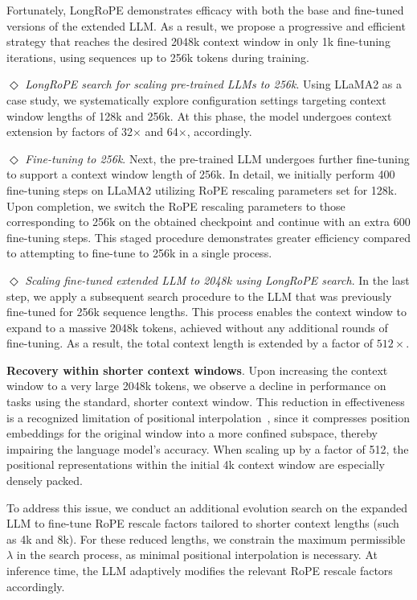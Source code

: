 Fortunately, LongRoPE demonstrates efficacy with both the base and fine-tuned versions of the extended LLM. As a result, we propose a progressive and efficient strategy that reaches the desired 2048k context window in only 1k fine-tuning iterations, using sequences up to 256k tokens during training.

$\Diamond$ \textit{LongRoPE search for scaling pre-trained LLMs to 256k}. Using LLaMA2 as a case study, we systematically explore configuration settings targeting context window lengths of 128k and 256k. At this phase, the model undergoes context extension by factors of 32$\times$ and 64$\times$, accordingly.

$\Diamond$ \textit{Fine-tuning to 256k}. Next, the pre-trained LLM undergoes further fine-tuning to support a context window length of 256k. In detail, we initially perform 400 fine-tuning steps on LLaMA2 utilizing RoPE rescaling parameters set for 128k. Upon completion, we switch the RoPE rescaling parameters to those corresponding to 256k on the obtained checkpoint and continue with an extra 600 fine-tuning steps. This staged procedure demonstrates greater efficiency compared to attempting to fine-tune to 256k in a single process.

$\Diamond$ \textit{Scaling fine-tuned extended LLM to 2048k using LongRoPE search}. In the last step, we apply a subsequent search procedure to the LLM that was previously fine-tuned for 256k sequence lengths. This process enables the context window to expand to a massive 2048k tokens, achieved without any additional rounds of fine-tuning. As a result, the total context length is extended by a factor of $512\times$.

\textbf{Recovery within shorter context windows}. Upon increasing the context window to a very large 2048k tokens, we observe a decline in performance on tasks using the standard, shorter context window. This reduction in effectiveness is a recognized limitation of positional interpolation~\cite{pi}, since it compresses position embeddings for the original window into a more confined subspace, thereby impairing the language model's accuracy. When scaling up by a factor of 512, the positional representations within the initial 4k context window are especially densely packed.

To address this issue, we conduct an additional evolution search on the expanded LLM to fine-tune RoPE rescale factors tailored to shorter context lengths (such as 4k and 8k). For these reduced lengths, we constrain the maximum permissible $\lambda$ in the search process, as minimal positional interpolation is necessary. At inference time, the LLM adaptively modifies the relevant RoPE rescale factors accordingly.

